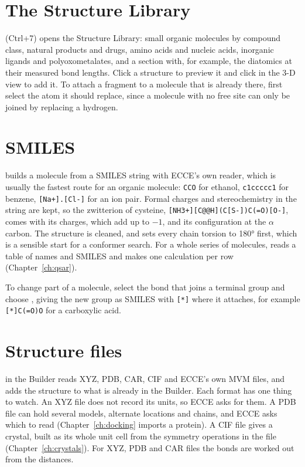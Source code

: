 \section{The Structure Library}
 (\textsf{Ctrl+7}) opens the Structure Library: small organic molecules by compound class, natural products and drugs, amino acids and nucleic acids, inorganic ligands and polyoxometalates, and a  section with, for example, the diatomics at their measured bond lengths. Click a structure to preview it and click in the 3-D view to add it. To attach a fragment to a molecule that is already there, first select the atom it should replace, since a molecule with no free site can only be joined by replacing a hydrogen.

\section{SMILES}
 builds a molecule from a SMILES string with ECCE's own reader, which is usually the fastest route for an organic molecule: \texttt{CCO} for ethanol, \texttt{c1ccccc1} for benzene, \texttt{[Na+].[Cl-]} for an ion pair. Formal charges and stereochemistry in the string are kept, so the zwitterion of cysteine, \texttt{[NH3+][C@@H](C[S-])C(=O)[O-]}, comes with its charges, which add up to $-1$, and its configuration at the $\alpha$ carbon. The structure is cleaned, and  sets every chain torsion to 180° first, which is a sensible start for a conformer search. For a whole series of molecules,  reads a table of names and SMILES and makes one calculation per row (Chapter~\ref{ch:qsar}).

To change part of a molecule, select the bond that joins a terminal group and choose , giving the new group as SMILES with \texttt{[*]} where it attaches, for example \texttt{[*]C(=O)O} for a carboxylic acid.

\section{Structure files}
 in the Builder reads XYZ, PDB, CAR, CIF and ECCE's own MVM files, and adds the structure to what is already in the Builder. Each format has one thing to watch. An XYZ file does not record its units, so ECCE asks for them. A PDB file can hold several models, alternate locations and chains, and ECCE asks which to read (Chapter~\ref{ch:docking} imports a protein). A CIF file gives a crystal, built as its whole unit cell from the symmetry operations in the file (Chapter~\ref{ch:crystals}). For XYZ, PDB and CAR files the bonds are worked out from the distances.

